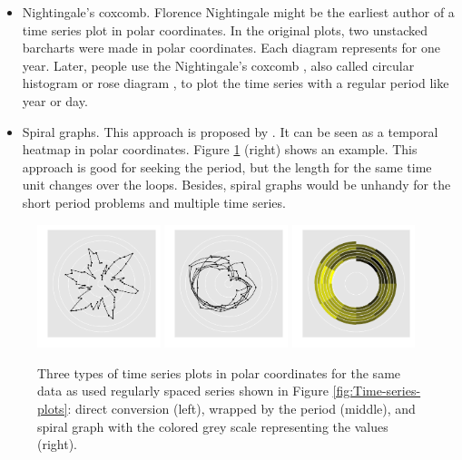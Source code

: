\documentclass[12pt]{article}
\begin{document}
\begin{itemize} \itemsep 0in
\item Nightingale's coxcomb. Florence Nightingale might be the earliest
author of a time series plot in polar coordinates. In the original
plots, two unstacked barcharts were made in polar coordinates. Each
diagram represents for one year. Later, people use the Nightingale's
coxcomb \citep{nightingale1858notes}, also called circular histogram
or rose diagram \citep{nemec1988shape}, to plot the time series with
a regular period like year or day.
\item Spiral graphs. This approach is proposed by \citet{weber2001visualizing}.
It can be seen as a temporal heatmap in polar coordinates. Figure
\ref{fig:polar-axis} (right) shows an example. This approach
is good for seeking the period, but the length for the same time unit
changes over the loops. Besides, spiral graphs would be unhandy for
the short period problems and multiple time series.
\end{itemize}

\begin{center}
\begin{figure}[htp]
\begin{centering}
\includegraphics[width=0.32\textwidth]{graph/pipeline-03-polarline}
\includegraphics[width=0.32\textwidth]{graph/pipeline-03-polarperiod}
\includegraphics[width=0.32\textwidth]{graph/pipeline-03-spiral}
\end{centering}
\caption{\label{fig:polar-axis}Three types of time series plots
in polar coordinates for the same data as used regularly spaced series shown in Figure
\ref{fig:Time-series-plots}:  direct conversion (left), wrapped by the period (middle), and
spiral graph with the colored grey scale representing the values (right).}
\end{figure}
\end{center}
\end{document}
